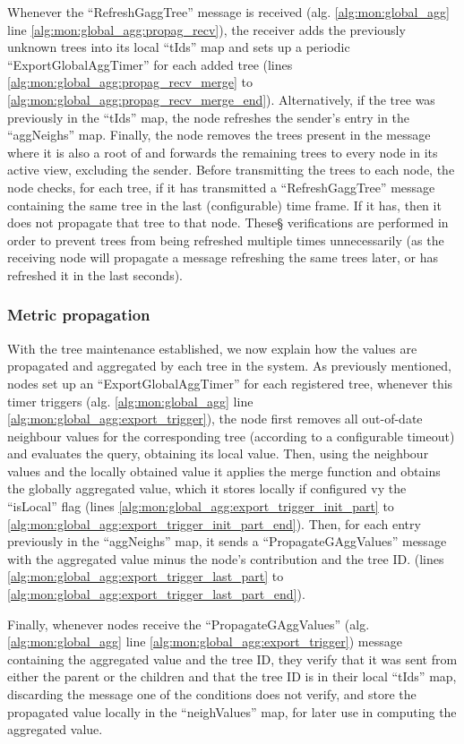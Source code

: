 Whenever the ``RefreshGaggTree'' message is received (alg. \ref{alg:mon:global_agg} line \ref{alg:mon:global_agg:propag_recv}), the receiver adds the previously unknown trees into its local ``tIds'' map and sets up a periodic ``ExportGlobalAggTimer'' for each added tree (lines \ref{alg:mon:global_agg:propag_recv_merge} to \ref{alg:mon:global_agg:propag_recv_merge_end}). Alternatively, if the tree was previously in the ``tIds'' map, the node refreshes the sender's entry in the ``aggNeighs'' map. Finally, the node removes the trees present in the message where it is also a root of and forwards the remaining trees to every node in its active view, excluding the sender. Before transmitting the trees to each node, the node checks, for each tree, if it has transmitted a ``RefreshGaggTree'' message containing the same tree in the last (configurable) time frame. If it has, then it does not propagate that tree to that node. These§ verifications are performed in order to prevent trees from being refreshed multiple times unnecessarily (as the receiving node will propagate a message refreshing the same trees later, or has refreshed it in the last seconds). 

\subsubsection{Metric propagation}

With the tree maintenance established, we now explain how the values are propagated and aggregated by each tree in the system. As previously mentioned, nodes set up an ``ExportGlobalAggTimer'' for each registered tree, whenever this timer triggers (alg.  \ref{alg:mon:global_agg} line \ref{alg:mon:global_agg:export_trigger}), the node first removes all out-of-date neighbour values for the corresponding tree (according to a configurable timeout) and evaluates the query, obtaining its local value. Then, using the neighbour values and the locally obtained value it applies the merge function and obtains the globally aggregated value, which it stores locally if configured vy the ``isLocal'' flag (lines \ref{alg:mon:global_agg:export_trigger_init_part} to \ref{alg:mon:global_agg:export_trigger_init_part_end}). Then, for each entry previously in the ``aggNeighs'' map, it sends a ``PropagateGAggValues'' message with the aggregated value minus the node's contribution and the tree ID. (lines \ref{alg:mon:global_agg:export_trigger_last_part} to \ref{alg:mon:global_agg:export_trigger_last_part_end}). 

Finally, whenever nodes receive the ``PropagateGAggValues'' (alg. \ref{alg:mon:global_agg} line \ref{alg:mon:global_agg:export_trigger}) message containing the aggregated value and the tree ID, they verify that it was sent from either the parent or the children and that the tree ID is in their local ``tIds'' map, discarding the message one of the conditions does not verify, and store the propagated value locally in the ``neighValues'' map, for later use in computing the aggregated value.

